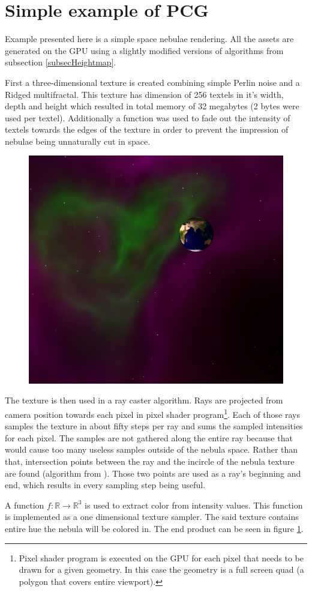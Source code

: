 \documentclass[journal]{IEEEtran}
\begin{document}
\section{Simple example of PCG}
Example presented here is a simple space nebulae rendering. All the assets are generated on the GPU using a slightly modified versions of algorithms from subsection \ref{subsecHeightmap}.
\par
First a three-dimensional texture is created combining simple Perlin noise and a Ridged multifractal. This texture has dimension of 256 textels in it's width, depth and height which resulted in total memory of 32 megabytes (2 bytes were used per textel). Additionally a function was used to fade out the intensity of textels towards the edges of the texture in order to prevent the impression of nebulae being unnaturally cut in space.\par
\begin{figure}[H]
	\centering
	\includegraphics[width=.6\linewidth]{nebulae.png}
	\label{fig:nebulaescene}
\end{figure}
The texture is then used in a ray caster algorithm. Rays are projected from camera position towards each pixel in pixel shader program\footnote{Pixel shader program is executed on the GPU for each pixel that needs to be drawn for a given geometry. In this case the geometry is a full screen quad (a polygon that covers entire viewport).}. Each of those rays samples the texture in about fifty steps per ray and sums the sampled intensities for each pixel. The samples are not gathered along the entire ray because that would cause too many useless samples outside of the nebula space. Rather than that, intersection points between the ray and the incircle of the nebula texture are found (algorithm from \cite{christer}). Those two points are used as a ray's beginning and end, which results in every sampling step being useful.
\par
A function $f:\mathbb{R}\rightarrow\mathbb{R}^{3}$ is used to extract color from intensity values. This function is implemented as a one dimensional texture sampler. The said texture contains entire hue the nebula will be colored in. The end product can be seen in figure \ref{fig:nebulaescene}.
\end{document}
